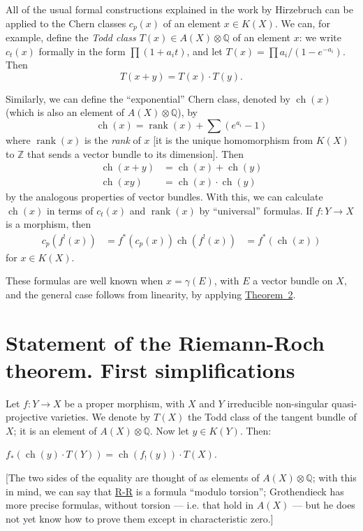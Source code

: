 \documentclass{article}
\theoremstyle{plain}
\newenvironment{theorem}[1]
    {\renewcommand\theinnertheorem{#1}\innertheorem}
    {\endinnertheorem}
\theoremstyle{definition}
\DeclareMathOperator{\ch}{ch}
\DeclareMathOperator{\rank}{rank}
\newcommand{\oldpage}[1]{\marginpar{\footnotesize$\Big\vert$ \textit{p.~#1}}}
\begin{document}
All of the usual formal constructions explained in the work by Hirzebruch \cite{9} can be applied to the Chern classes $c_p(x)$ of an element $x\in K(X)$.
We can, for example, define the \emph{Todd class $T(x)\in A(X)\otimes\mathbb{Q}$} of an element $x$:
we write $c_t(x)$ formally in the form $\prod(1+a_it)$, and let $T(x)=\prod a_i/(1-e^{-a_i})$.
Then
\[
  T(x+y) = T(x)\cdot T(y).
\]

Similarly, we can define the ``exponential'' Chern class, denoted by $\ch(x)$ (which is also an element of $A(X)\otimes\mathbb{Q}$), by
\[
  \ch(x) = \rank(x)+\sum(e^{a_i}-1)
\]
where $\rank(x)$ is the \emph{rank} of $x$ [it is the unique homomorphism from $K(X)$ to $\mathbb{Z}$ that sends a vector bundle to its dimension].
Then
\[
  \begin{aligned}
    \ch(x+y) &= \ch(x)+\ch(y)
  \\\ch(xy) &= \ch(x)\cdot\ch(y)
  \end{aligned}
\]
by the analogous properties of vector bundles.
With this, we can calculate $\ch(x)$ in terms of $c_t(x)$ and $\rank(x)$ by ``universal'' formulas.
If $f\colon Y\to X$ is a morphism, then
\[
  \begin{aligned}
    c_p(f^!(x)) &= f^*(c_p(x))
    \ch(f^!(x)) &= f^*(\ch(x))
  \end{aligned}
\]
for $x\in K(X)$.

These formulas are well known when $x=\gamma(E)$, with $E$ a vector bundle on $X$, and the general case follows from linearity, by applying \hyperref[theorem2]{Theorem~2}.


\section{Statement of the Riemann-Roch theorem. First simplifications}
\label{section7}

\oldpage{113}
Let $f\colon Y\to X$ be a proper morphism, with $X$ and $Y$ irreducible non-singular quasi-projective varieties.
We denote by $T(X)$ the Todd class of the tangent bundle of $X$;
it is an element of $A(X)\otimes\mathbb{Q}$.
Now let $y\in K(Y)$.
Then:

\begin{theorem}{(Riemann-Roch)}
\label{theoremriemannroch}
  $f_*(\ch(y)\cdot T(Y)) = \ch(f_!(y))\cdot T(X)$.
\end{theorem}

[The two sides of the equality are thought of as elements of $A(X)\otimes\mathbb{Q}$;
with this in mind, we can say that \hyperref[theoremriemannroch]{R-R} is a formula ``modulo torsion'';
Grothendieck has more precise formulas, without torsion --- i.e. that hold in $A(X)$ --- but he does not yet know how to prove them except in characteristic zero.]
\end{document}
